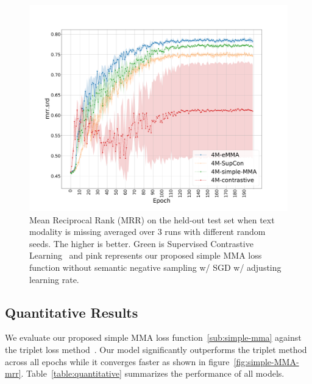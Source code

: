 \documentclass[sigconf,natbib=true,anonymous=true]{acmart}
\newcommand{\todokdinline}[1]{\todo[color=red!20,inline]{{KD: \small #1}}}
\begin{document}
\begin{figure}[tbh]
\centering
\includegraphics[width=.99\columnwidth]{Figures/average-seeds-epochs-mrr_ard.pdf}
\caption{Mean Reciprocal Rank (MRR) on the held-out test set when text modality is missing averaged over 3 runs with different random seeds. The higher is better. Green is Supervised Contrastive Learning~\cite{NEURIPS2020_supervised_contrastive} and pink represents our proposed simple MMA loss function without semantic negative sampling w/ SGD w/ adjusting learning rate.
}

\label{fig:simple-MMA-mrr.srd}
\end{figure}




\subsection{Quantitative Results}
\label{sec:Quantitative}

We evaluate our proposed simple MMA loss function~\ref{sub:simple-mma} against the triplet loss method~\cite{triplet_loss_2021_CVPR}. Our model significantly outperforms the triplet method across all epochs while it converges faster as shown in figure~\ref{fig:simple-MMA-mrr}.
Table~\ref{table:quantitative} summarizes the performance of all models.
\end{document}
